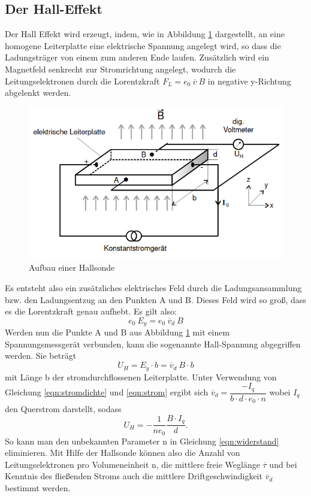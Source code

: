\subsection{Der Hall-Effekt}
    Der Hall Effekt wird erzeugt, indem, wie in Abbildung \ref{fig:hall}
    dargestellt, an eine homogene Leiterplatte eine elektrische Spannung angelegt wird,
    so dass die Ladungsträger von einem zum anderen Ende laufen. Zusätzlich wird ein 
    Magnetfeld senkrecht zur Stromrichtung angelegt, wodurch die Leitungselektronen
    durch die Lorentzkraft $F_L = e_0 \ \overline v \ B$ in negative y-Richtung
    abgelenkt werden. 
    \begin{figure}[H]
     \includegraphics[width=\linewidth]{hallsonde.png}
     \caption{Aufbau einer Hallsonde}
     \label{fig:hall}
    \end{figure}
    \noindent Es entsteht also ein zusätzliches elektrisches Feld durch die 
    Ladungsansammlung bzw. den Ladungsentzug an den Punkten A und B. Dieses Feld
    wird so groß, dass es die Lorentzkraft genau aufhebt. Es gilt also:
    \begin{equation}
        e_0 \ E_y = e_0\ \overline v_d \ B
    \end{equation} 
    Werden nun die Punkte A und B aus
    Abbildung \ref{fig:hall} mit einem Spannungsmessgerät verbunden, kann die sogenannte
    Hall-Spannung abgegriffen werden. Sie beträgt
    \begin{equation}
        U_H = E_y\cdot b = \overline v_d\ B \cdot b
    \end{equation}
    mit Länge b der stromdurchflossenen Leiterplatte. Unter Verwendung von Gleichung 
    \eqref{eqn:stromdichte} und \eqref{eqn:strom} ergibt sich $\overline v_d = \dfrac{-I_q}
    {b\cdot d\cdot e_0 \cdot n}$ wobei $I_q$ den Querstrom darstellt, sodass
    \begin{equation}
        \label{eqn:hallspannung}
        U_H = -\dfrac{1}{n e_0} \dfrac{B\cdot I_q}{d}.
    \end{equation}
    So kann man den unbekannten Parameter n in Gleichung \eqref{eqn:widerstand} eliminieren. 
    Mit Hilfe der Hallsonde können also die Anzahl von Leitungselektronen pro Volumeneinheit
    n, die mittlere freie Weglänge $\overline \tau$ und bei Kenntnis des fließenden Stroms auch die 
    mittlere Driftgeschwindigkeit $\overline v_d$ bestimmt werden.
